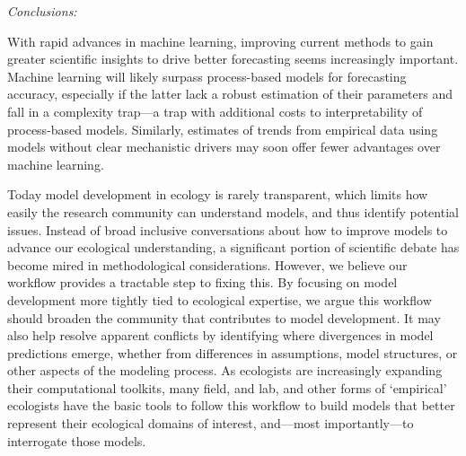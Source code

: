 \documentclass[11pt]{article}
\newcommand{\llabel}[1]{\hypertarget{lintarget:#1}{}\linelabel{lin:#1}}
\begin{document}
\emph{Conclusions:} 

With rapid advances in machine learning, improving current methods to gain greater scientific insights to drive better forecasting seems increasingly important. \llabel{MLvsPBM}Machine learning will likely surpass process-based models for forecasting accuracy, especially if the latter lack a robust estimation of their parameters and fall in a complexity trap---a trap with additional costs to interpretability of process-based models. Similarly, estimates of trends from empirical data using models without clear mechanistic drivers may soon offer fewer advantages over machine learning. 


Today model development in ecology is rarely transparent, which limits how easily the research community can understand models, and thus identify potential issues. Instead of broad inclusive conversations about how to improve models to advance our ecological understanding, a significant portion of scientific debate has become mired in methodological considerations. However, we believe our workflow provides a tractable step to fixing this. By focusing on model development more tightly tied to ecological expertise, we argue this workflow should broaden the community that contributes to model development. It may also help resolve apparent conflicts by identifying where divergences in model predictions emerge, whether from differences in assumptions, model structures, or other aspects of the modeling process.
As ecologists are increasingly expanding their computational toolkits, many field, and lab, and other forms of `empirical' ecologists have the basic tools to follow this workflow to build models that better represent their ecological domains of interest, and---most importantly---to interrogate those models.
\end{document}
